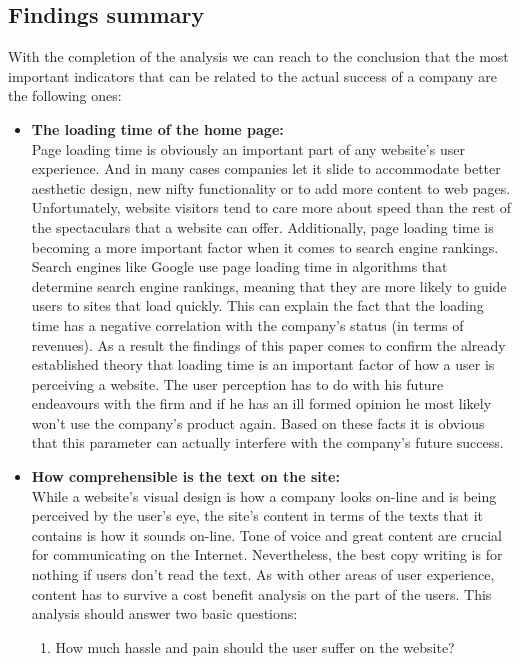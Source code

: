 \documentclass{article}
\begin{document}
\subsection{Findings summary}
With the completion of the analysis we can reach to the conclusion that the most important indicators that can be related to the actual success of a company are the following ones:
\begin{itemize}
\item  \textbf{The loading time of the home page:} \\
Page loading time is obviously an important part of any website's user experience. And in many cases companies let it slide to accommodate better aesthetic design, new nifty functionality or to add more content to web pages. Unfortunately, website visitors tend to care more about speed than the rest of the spectaculars that a website can offer. Additionally, page loading time is becoming a more important factor when it comes to search engine rankings.\\
Search engines like Google use page loading time in algorithms that determine search engine rankings, meaning that they are more likely to guide users to sites that load quickly. This can explain the fact that the loading time has a negative correlation with the company's status (in terms of revenues). As a result the findings of this paper comes to confirm the already established theory that loading time is an important factor of how a user is perceiving a website. The user perception has to do with his future endeavours with the firm and if he has an ill formed opinion he most likely won't use the company's product again. Based on these facts it is obvious that this parameter can actually interfere with the company's future success. 
\item  \textbf{How comprehensible is the text on the site:} \\
While a website's visual design is how a company looks on-line and is being perceived by the user's eye, the site's content in terms of the texts that it contains is how it sounds on-line. Tone of voice and great content are crucial for communicating on the Internet. Nevertheless, the best copy writing is for nothing if users don't read the text. As with other areas of user experience, content has to survive a cost benefit analysis on the part of the users. This analysis should answer two basic questions:
\begin{enumerate}
\item How much hassle and pain should the user suffer on the website?

\end{enumerate}
\end{itemize}
\end{document}
